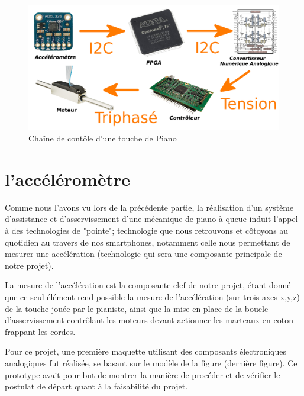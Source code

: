 \documentclass[french,a4paper,12pt]{report}
\begin{document}
		\begin{figure}[!ht]
    \center
  	\includegraphics[width=17cm]{CH.png}
    \caption{Chaîne de contôle d'une touche de Piano}
	\end{figure}
	
			\section{l'accéléromètre}
						
			Comme nous l'avons vu lors de la précédente partie, la réalisation d'un système d'assistance et d'asservissement d'une mécanique de piano à queue induit l'appel à des technologies de "pointe"; technologie que nous retrouvons et côtoyons au quotidien au travers de nos smartphones, notamment celle nous permettant de mesurer une accélération (technologie qui sera une composante principale de notre projet).
 
La mesure de l'accélération est la composante clef de notre projet, étant donné que ce seul élément rend possible la mesure de l'accélération (sur trois axes x,y,z) de la touche jouée par le pianiste, ainsi que la mise en place de la boucle d'asservissement contrôlant les moteurs devant actionner les marteaux en coton frappant les cordes.

			
			Pour ce projet, une première maquette utilisant des composants électroniques analogiques fut réalisée, se basant sur le modèle de la figure (dernière figure). Ce prototype avait pour but de montrer la manière de procéder et de vérifier le postulat de départ quant à la faisabilité du projet.
 
\end{document}
